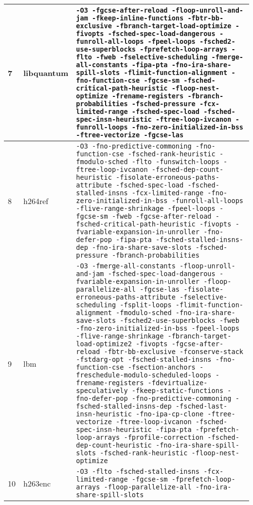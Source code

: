 \documentclass[twocolumn, 10pt]{article}
\begin{document}
\begin{tabularx}{\textwidth}{llX}
        \midrule
        7 & libquantum & \texttt{-O3 -fgcse-after-reload -floop-unroll-and-jam -fkeep-inline-functions -fbtr-bb-exclusive -fbranch-target-load-optimize -fivopts -fsched-spec-load-dangerous -funroll-all-loops -fpeel-loops -fsched2-use-superblocks -fprefetch-loop-arrays -flto -fweb -fselective-scheduling -fmerge-all-constants -fipa-pta -fno-ira-share-spill-slots -flimit-function-alignment -fno-function-cse -fgcse-sm -fsched-critical-path-heuristic -floop-nest-optimize -frename-registers -fbranch-probabilities -fsched-pressure -fcx-limited-range -fsched-spec-load -fsched-spec-insn-heuristic -ftree-loop-ivcanon -funroll-loops -fno-zero-initialized-in-bss -ftree-vectorize -fgcse-las}\\
        \midrule
        8 & h264ref & \texttt{-O3 -fno-predictive-commoning -fno-function-cse -fsched-rank-heuristic -fmodulo-sched -flto -funswitch-loops -ftree-loop-ivcanon -fsched-dep-count-heuristic -fisolate-erroneous-paths-attribute -fsched-spec-load -fsched-stalled-insns -fcx-limited-range -fno-zero-initialized-in-bss -funroll-all-loops -flive-range-shrinkage -fpeel-loops -fgcse-sm -fweb -fgcse-after-reload -fsched-critical-path-heuristic -fivopts -fvariable-expansion-in-unroller -fno-defer-pop -fipa-pta -fsched-stalled-insns-dep -fno-ira-share-save-slots -fsched-pressure -fbranch-probabilities} \\
        \midrule
        9 & lbm & \texttt{-O3 -fmerge-all-constants -floop-unroll-and-jam -fsched-spec-load-dangerous -fvariable-expansion-in-unroller -floop-parallelize-all -fgcse-las -fisolate-erroneous-paths-attribute -fselective-scheduling -fsplit-loops -flimit-function-alignment -fmodulo-sched -fno-ira-share-save-slots -fsched2-use-superblocks -fweb -fno-zero-initialized-in-bss -fpeel-loops -flive-range-shrinkage -fbranch-target-load-optimize2 -fivopts -fgcse-after-reload -fbtr-bb-exclusive -fconserve-stack -fstdarg-opt -fsched-stalled-insns -fno-function-cse -fsection-anchors -freschedule-modulo-scheduled-loops -frename-registers -fdevirtualize-speculatively -fkeep-static-functions -fno-defer-pop -fno-predictive-commoning -fsched-stalled-insns-dep -fsched-last-insn-heuristic -fno-ipa-cp-clone -ftree-vectorize -ftree-loop-ivcanon -fsched-spec-insn-heuristic -fipa-pta -fprefetch-loop-arrays -fprofile-correction -fsched-dep-count-heuristic -fno-ira-share-spill-slots -fsched-rank-heuristic -floop-nest-optimize}\\
        \midrule
        10 & h263enc & \texttt{-O3 -flto -fsched-stalled-insns -fcx-limited-range -fgcse-sm -fprefetch-loop-arrays -floop-parallelize-all -fno-ira-share-spill-slots} \\

\end{tabularx}
\end{document}
